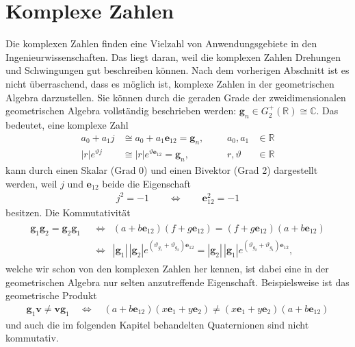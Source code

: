 %
%
%
\section{Komplexe Zahlen}

Die komplexen Zahlen finden eine Vielzahl von Anwendungsgebiete in den Ingenieurwissenschaften. Das liegt daran, weil die komplexen Zahlen Drehungen und Schwingungen gut beschreiben können. Nach dem vorherigen Abschnitt ist es nicht überraschend, dass es möglich ist, komplexe Zahlen in der geometrischen Algebra darzustellen. Sie können durch die geraden Grade der zweidimensionalen geometrischen Algebra vollständig beschrieben werden: $\mathbf{g}_n \in G_2^+(\mathbb{R}) \cong \mathbb{C}$. Das bedeutet, eine komplexe Zahl 
\begin{equation*}
\begin{aligned}
a_0 + a_1 j &\cong a_0 + a_1 \mathbf{e}_{12} = \mathbf{g}_n,&&& a_0, a_1 &\in \mathbb{R}\\
|r|e^{\vartheta j} &\cong |r|e^{\vartheta \mathbf{e}_{12}} = \mathbf{g}_n,&&& r, \vartheta &\in \mathbb{R}
\end{aligned}
\end{equation*}
kann durch einen Skalar (Grad 0) und einen Bivektor (Grad 2) dargestellt werden, weil $j$ und $\mathbf{e}_{12}$ beide die Eigenschaft
\begin{align*}
j^2 = -1\qquad\Leftrightarrow\qquad\mathbf{e}_{12}^2 = -1
\end{align*}
besitzen. Die Kommutativität
\begin{align*}
\begin{split}
\mathbf{g}_1\mathbf{g}_2 = \mathbf{g}_2\mathbf{g}_1 \enspace&\Leftrightarrow\enspace (a + b \mathbf{e}_{12})(f + g \mathbf{e}_{12}) = (f + g \mathbf{e}_{12})(a + b \mathbf{e}_{12})\\ &\Leftrightarrow\enspace |\mathbf{g}_1|\,|\mathbf{g}_2|e^{(\vartheta_{g_1} + \vartheta_{g_2})\mathbf{e}_{12}} =  |\mathbf{g}_2|\,|\mathbf{g}_1|e^{(\vartheta_{g_2} + \vartheta_{g_1})\mathbf{e}_{12}},
\end{split}
\end{align*}
welche wir schon von den komplexen Zahlen her kennen, ist dabei eine in der geometrischen Algebra nur selten anzutreffende Eigenschaft. Beispielsweise ist das geometrische Produkt 
\begin{align*}
\mathbf{g}_1\mathbf{v}\not= \mathbf{v}\mathbf{g}_1 \quad\Leftrightarrow\quad(a + b \mathbf{e}_{12})(x\mathbf{e}_1+y\mathbf{e}_2)\not= (x\mathbf{e}_1+y\mathbf{e}_2)(a + b \mathbf{e}_{12})
\end{align*}
und auch die im folgenden Kapitel behandelten Quaternionen sind nicht kommutativ.


